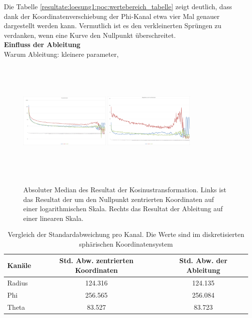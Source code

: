 Die Tabelle \ref{resultate:loesung1:poc:wertebereich_tabelle} zeigt deutlich, dass dank der Koordinatenverschiebung der Phi-Kanal etwa vier Mal genauer dargestellt werden kann. Vermutlich ist es den verkleinerten Sprüngen zu verdanken, wenn eine Kurve den Nullpunkt überschreitet.\\
[\baselineskip]
\textbf{Einfluss der Ableitung}\\
Warum Ableitung: kleinere parameter,
\begin{figure}[!htbp]
	\center
	\includegraphics[width=0.4\textwidth,height=6cm,keepaspectratio]{./pictures/resultate/loesung1/spherical_log.png}
	\includegraphics[width=0.4\textwidth,height=6cm,keepaspectratio]{./pictures/resultate/loesung1/spherical_dt.png}
	\caption{Absoluter Median des Resultat der Kosinustransformation. Links ist das Resultat der um den Nullpunkt zentrierten Koordinaten auf einer logarithmischen Skala. Rechts das Resultat der Ableitung auf einer linearen Skala.}
	\label{resultate:loesung1:poc:ableitung}
\end{figure} 
\begin{table}[!htbp]
\center
	\begin{tabular}{l|c|c}
	 Kanäle & Std. Abw. zentrierten Koordinaten &  Std. Abw. der Ableitung\\\hline
	 Radius & 124.316 & 124.135\\
	 Phi & 256.565 & 256.084\\
	 Theta & 83.527 & 83.723\\
	\end{tabular}
	\caption{Vergleich der Standardabweichung pro Kanal. Die Werte sind im diskretisierten sphärischen Koordinatensystem}
	\label{resultate:loesung1:poc:ableitung_tabelle}
\end{table}
